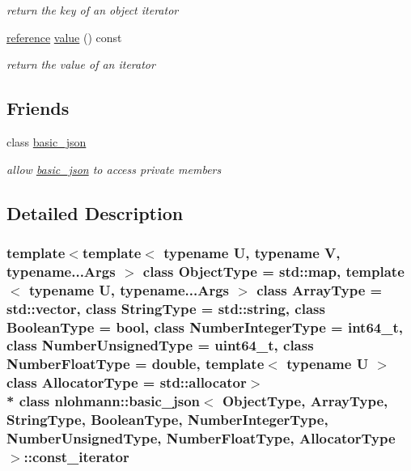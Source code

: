 \begin{DoxyCompactItemize}
\begin{DoxyCompactList}\small\item\em return the key of an object iterator \end{DoxyCompactList}\item 
\hyperlink{a00038_aefd248cac6493eed1e6ff53ba6a63eb2}{reference} \hyperlink{a00038_ac75e80d30b6169ee2a29ec93fb4d2acd}{value} () const \hypertarget{a00038_ac75e80d30b6169ee2a29ec93fb4d2acd}{}\label{a00038_ac75e80d30b6169ee2a29ec93fb4d2acd}

\begin{DoxyCompactList}\small\item\em return the value of an iterator \end{DoxyCompactList}\end{DoxyCompactItemize}
\subsection*{Friends}
\begin{DoxyCompactItemize}
\item 
class \hyperlink{a00038_ada3100cdb8700566051828f1355fa745}{basic\+\_\+json}\hypertarget{a00038_ada3100cdb8700566051828f1355fa745}{}\label{a00038_ada3100cdb8700566051828f1355fa745}

\begin{DoxyCompactList}\small\item\em allow \hyperlink{a00025}{basic\+\_\+json} to access private members \end{DoxyCompactList}\end{DoxyCompactItemize}


\subsection{Detailed Description}
\subsubsection*{template$<$template$<$ typename U, typename V, typename...\+Args $>$ class Object\+Type = std\+::map, template$<$ typename U, typename...\+Args $>$ class Array\+Type = std\+::vector, class String\+Type = std\+::string, class Boolean\+Type = bool, class Number\+Integer\+Type = int64\+\_\+t, class Number\+Unsigned\+Type = uint64\+\_\+t, class Number\+Float\+Type = double, template$<$ typename U $>$ class Allocator\+Type = std\+::allocator$>$\\*
class nlohmann\+::basic\+\_\+json$<$ Object\+Type, Array\+Type, String\+Type, Boolean\+Type, Number\+Integer\+Type, Number\+Unsigned\+Type, Number\+Float\+Type, Allocator\+Type $>$\+::const\+\_\+iterator}

